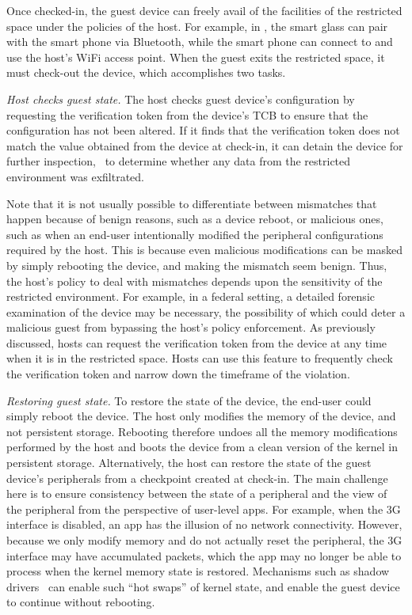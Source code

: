 Once checked-in, the guest device can freely avail of the facilities of the
restricted space under the policies of the host. For example, in
, the smart glass can pair with the smart phone
via Bluetooth, while the smart phone can connect to and use the host's WiFi
access point. When the guest exits the restricted space, it must check-out the
device, which accomplishes two tasks.
%
\begin{mylist}
%
\item \textit{Host checks guest state.} The host checks guest device's
configuration by requesting the verification token from the device's TCB to
ensure that the configuration has not been altered. If it finds that the
verification token does not match the value obtained from the device at
check-in, it can detain the device for further inspection, \eg~to determine
whether any data from the restricted environment was exfiltrated.

Note that it is not usually possible to differentiate between mismatches that
happen because of benign reasons, such as a device reboot, or malicious ones,
such as when an end-user intentionally modified the peripheral configurations
required by the host. This is because even malicious modifications can be
masked by simply rebooting the device, and making the mismatch seem benign.
Thus, the host's policy to deal with mismatches depends upon the sensitivity of
the restricted environment. For example, in a federal setting, a detailed
forensic examination of the device may be necessary, the possibility of which
could deter a malicious guest from bypassing the host's policy enforcement. As
previously discussed, hosts can request the verification token from the device
at any time when it is in the restricted space. Hosts can use this feature to
frequently check the verification token and narrow down the timeframe of the
violation.

\item \textit{Restoring guest state.} To restore the state of the device, the
end-user could simply reboot the device. The host only modifies the memory of
the device, and not persistent storage. Rebooting therefore undoes all the
memory modifications performed by the host and boots the device from a clean
version of the kernel in persistent storage. Alternatively, the host can
restore the state of the guest device's peripherals from a checkpoint created
at check-in. The main challenge here is to ensure consistency between the state
of a peripheral and the view of the peripheral from the perspective of
user-level apps. For example, when the 3G interface is disabled, an app has the
illusion of no network connectivity. However, because we only modify memory and
do not actually reset the peripheral, the 3G interface may have accumulated
packets, which the app may no longer be able to process when the kernel memory
state is restored.  Mechanisms such as shadow drivers~\cite{shadow:tocs06} can
enable such ``hot swaps'' of kernel state, and enable the guest device to
continue without rebooting.
%
\end{mylist}

